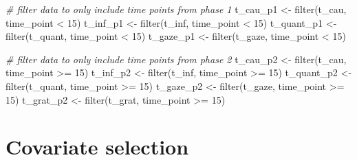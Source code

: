 \documentclass[
]{article}
\newenvironment{Shaded}{\begin{snugshade}}{\end{snugshade}}
\newcommand{\CommentTok}[1]{\textcolor[rgb]{0.56,0.35,0.01}{\textit{#1}}}
\newcommand{\DecValTok}[1]{\textcolor[rgb]{0.00,0.00,0.81}{#1}}
\newcommand{\FunctionTok}[1]{\textcolor[rgb]{0.00,0.00,0.00}{#1}}
\newcommand{\NormalTok}[1]{#1}
\newcommand{\OtherTok}[1]{\textcolor[rgb]{0.56,0.35,0.01}{#1}}
\newcommand{\SpecialCharTok}[1]{\textcolor[rgb]{0.00,0.00,0.00}{#1}}
\begin{document}
\begin{Shaded}
\begin{Highlighting}[]
\CommentTok{\# filter data to only include time points from phase 1}
\NormalTok{t\_cau\_p1 }\OtherTok{\textless{}{-}} \FunctionTok{filter}\NormalTok{(t\_cau, time\_point }\SpecialCharTok{\textless{}} \DecValTok{15}\NormalTok{)}
\NormalTok{t\_inf\_p1 }\OtherTok{\textless{}{-}} \FunctionTok{filter}\NormalTok{(t\_inf, time\_point }\SpecialCharTok{\textless{}} \DecValTok{15}\NormalTok{)}
\NormalTok{t\_quant\_p1 }\OtherTok{\textless{}{-}} \FunctionTok{filter}\NormalTok{(t\_quant, time\_point }\SpecialCharTok{\textless{}} \DecValTok{15}\NormalTok{)}
\NormalTok{t\_gaze\_p1 }\OtherTok{\textless{}{-}} \FunctionTok{filter}\NormalTok{(t\_gaze, time\_point }\SpecialCharTok{\textless{}} \DecValTok{15}\NormalTok{)}

\CommentTok{\# filter data to only include time points from phase 2}
\NormalTok{t\_cau\_p2 }\OtherTok{\textless{}{-}} \FunctionTok{filter}\NormalTok{(t\_cau, time\_point }\SpecialCharTok{\textgreater{}=} \DecValTok{15}\NormalTok{)}
\NormalTok{t\_inf\_p2 }\OtherTok{\textless{}{-}} \FunctionTok{filter}\NormalTok{(t\_inf, time\_point }\SpecialCharTok{\textgreater{}=} \DecValTok{15}\NormalTok{)}
\NormalTok{t\_quant\_p2 }\OtherTok{\textless{}{-}} \FunctionTok{filter}\NormalTok{(t\_quant, time\_point }\SpecialCharTok{\textgreater{}=} \DecValTok{15}\NormalTok{)}
\NormalTok{t\_gaze\_p2 }\OtherTok{\textless{}{-}} \FunctionTok{filter}\NormalTok{(t\_gaze, time\_point }\SpecialCharTok{\textgreater{}=} \DecValTok{15}\NormalTok{)}
\NormalTok{t\_grat\_p2 }\OtherTok{\textless{}{-}} \FunctionTok{filter}\NormalTok{(t\_grat, time\_point }\SpecialCharTok{\textgreater{}=} \DecValTok{15}\NormalTok{)}
\end{Highlighting}
\end{Shaded}

\hypertarget{covariate-selection}{%
\section{Covariate selection}\label{covariate-selection}}
\end{document}
